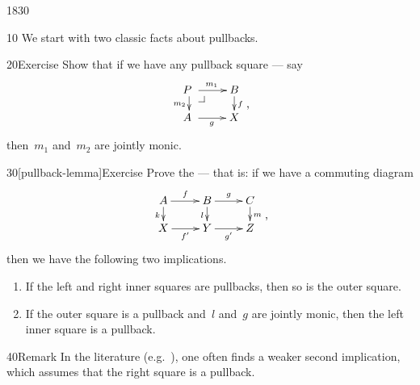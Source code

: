 \begin{parsec}{1830}%
\begin{point}{10}%
    We start with two classic facts about pullbacks.
\end{point}
\begin{point}{20}{Exercise}%
Show that if we have any pullback square --- say
\begin{equation*}
    \vcenter{\vbox{\xymatrix@R-1pc{
        {P\ } \pullback \ar[r]^{m_1} \ar[d]_{m_2}
        & B \ar[d]^f
                \\ {A\ } \ar[r]_{g}
    & X}}} \text{,}
\end{equation*}
then~$m_1$ and~$m_2$ are jointly monic.
\end{point}

\begin{point}{30}[pullback-lemma]{Exercise}%
Prove the  --- that is:
    if we have a commuting diagram
\begin{equation*}
    \vcenter{\vbox{\xymatrix@R-1pc{
                A \ar[r]^f \ar[d]_k
                & B \ar[r]^g \ar[d]_l
                & C \ar[d]^m
                \\ X \ar[r]_{f'}
                & Y \ar[r]_{g'}
                & Z
    }}} \text{,}
\end{equation*}
then we have the following two implications.
\begin{enumerate}
\item
If the left and right inner squares are pullbacks,
    then so is the outer square.
\item
If the outer square is a pullback
    and~$l$ and~$g$ are jointly monic,
    then the left inner square is a pullback.
\end{enumerate}
\begin{point}{40}{Remark}%
In the literature (e.g.~\cite[III.5 exc.~8]{maclane}),
    one often finds a weaker second implication,
    which assumes that the right square is a pullback.
\end{point}
\end{point}
\end{parsec}

